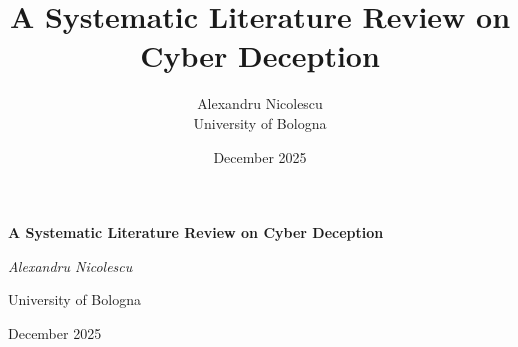 \documentclass[a4paper, 12pt]{article}
\title{A Systematic Literature Review on Cyber Deception}
\author{Alexandru Nicolescu \\ \small University of Bologna}
\date{December 2025}
\begin{document}
\begin{titlepage}
    \centering
    \null
    \vspace{0.3\textheight}

    {\Huge\bfseries A Systematic Literature Review on Cyber Deception\par}

    \vfill

    {\large\itshape Alexandru Nicolescu\par}
    \vspace{0.3cm}
    {\normalsize University of Bologna\par}
    \vspace{1cm}
    {\large December 2025\par}
    \vspace{1cm}

\end{titlepage}

\newpage











\newpage
\printbibliography[title={References}]
\end{document}
